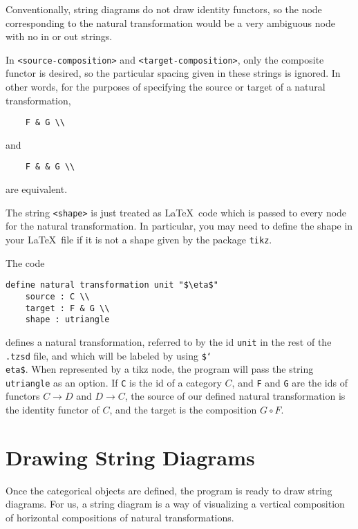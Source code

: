 \documentclass{amsart}
\newcommand{\vlength}{0.2cm}
\begin{document}
Conventionally, string diagrams do not draw identity functors, so the node 
    corresponding to the natural transformation would be a very
    ambiguous node with no in or out strings.
\begin{remark}
    In \texttt{<source-composition>} and \texttt{<target-composition>},
        only the composite functor is desired, so the particular spacing given in these strings is
        ignored.
    In other words, for the purposes of specifying the source or target of a natural transformation,
\vspace{\vlength}
\begin{verbatim}
    F & G \\
\end{verbatim}
\vspace{\vlength}
and
\vspace{\vlength}
\begin{verbatim}
    F & & G \\
\end{verbatim}
\vspace{\vlength}
    are equivalent.
\end{remark}
\begin{remark}
    The string \texttt{<shape>} is just treated as \LaTeX\ code which is passed to 
        every node for the natural transformation.
    In particular, you may need to define the shape in your \LaTeX\ file
        if it is not a shape given by the package \texttt{tikz}.
\end{remark}
\begin{example}
    The code
\vspace\vlength
\begin{verbatim}
define natural transformation unit "$\eta$"
    source : C \\
    target : F & G \\
    shape : utriangle
\end{verbatim}
\vspace\vlength
defines a natural transformation, referred to by the id \texttt{unit} in the rest
    of the \texttt{.tzsd} file, and which will be labeled by using \texttt{\$\char`\\eta\$}.
When represented by a tikz node, the program will pass the string
    \texttt{utriangle} as an option.
If \texttt{C} is the id of a category $C$, and \texttt{F} and \texttt{G}
    are the ids of functors $C\to D$ and $D\to C$,
    the source of our defined natural transformation is the identity functor of $C$,
    and the target is the composition $G\circ F$.
\end{example}
\section{Drawing String Diagrams} \label{draw-ref}
Once the categorical objects are defined, the program is ready to draw string diagrams.
For us, a string diagram is a way of visualizing a vertical composition
    of horizontal compositions of natural transformations.
\end{document}

